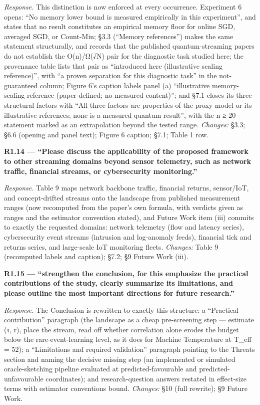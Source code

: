 \documentclass[
  11pt,
]{article}
\begin{document}
\emph{Response.} This distinction is now enforced at every occurrence.
Experiment 6 opens: ``No memory lower bound is measured empirically in
this experiment'', and states that no result constitutes an empirical
memory floor for online SGD, averaged SGD, or Count-Min; §3.3 (``Memory
references'') makes the same statement structurally, and records that
the published quantum-streaming papers do not establish the O(n)/Ω(√N)
pair for the diagnostic task studied here; the provenance table lists
that pair as ``introduced here (illustrative scaling reference)'', with
``a proven separation for this diagnostic task'' in the not-guaranteed
column; Figure 6's caption labels panel (a) ``illustrative
memory-scaling reference (paper-defined; no measured content)''; and
§7.1 closes its three structural factors with ``All three factors are
properties of the proxy model or its illustrative references; none is a
measured quantum result'', with the n ≥ 20 statement marked as an
extrapolation beyond the tested range. \emph{Changes:} §3.3; §6.6
(opening and panel text); Figure 6 caption; §7.1; Table 1 row.

\textbf{R1.14 --- ``Please discuss the applicability of the proposed
framework to other streaming domains beyond sensor telemetry, such as
network traffic, financial streams, or cybersecurity monitoring.''}

\emph{Response.} Table 9 maps network backbone traffic, financial
returns, sensor/IoT, and concept-drifted streams onto the landscape from
published measurement ranges (now recomputed from the paper's own
formula, with verdicts given as ranges and the estimator convention
stated), and Future Work item (iii) commits to exactly the requested
domains: network telemetry (flow and latency series), cybersecurity
event streams (intrusion and log-anomaly feeds), financial tick and
returns series, and large-scale IoT monitoring fleets. \emph{Changes:}
Table 9 (recomputed labels and caption); §7.2; §9 Future Work (iii).

\textbf{R1.15 --- ``strengthen the conclusion, for this emphasize the
practical contributions of the study, clearly summarize its limitations,
and please outline the most important directions for future research.''}

\emph{Response.} The Conclusion is rewritten to exactly this structure:
a ``Practical contribution'' paragraph (the landscape as a cheap
pre-screening step --- estimate (τ, r), place the stream, read off
whether correlation alone erodes the budget below the
rare-event-learning level, as it does for Machine Temperature at T\_eff
= 52); a ``Limitations and required validation'' paragraph pointing to
the Threats section and naming the decisive missing step (an implemented
or simulated oracle-sketching pipeline evaluated at predicted-favourable
and predicted-unfavourable coordinates); and research-question answers
restated in effect-size terms with estimator conventions bound.
\emph{Changes:} §10 (full rewrite); §9 Future Work.
\end{document}
